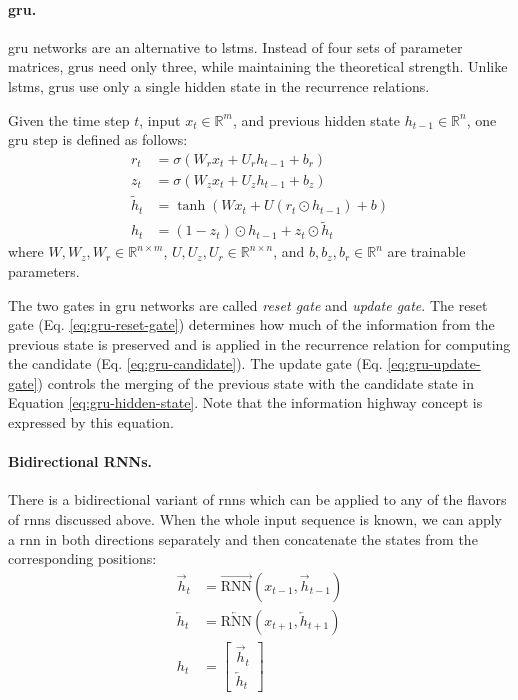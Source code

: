 \paragraph{\acs{gru}.} \acl{gru} networks \citep{cho-etal-2014-properties} are
an alternative to \acp{lstm}. Instead of four sets of parameter matrices,
\acp{gru} need only three, while maintaining the theoretical strength. Unlike
\acp{lstm}, \acp{gru} use only a single hidden state in the recurrence
relations.

Given the time step $t$, input $x_t \in \mathbb{R}^m$, and previous hidden
state $h_{t-1} \in \mathbb{R}^n$, one \ac{gru} step is defined as follows:
%
\begin{align}
  r_t &= \sigma\left(W_r x_t + U_r h_{t-1} + b_r\right) \label{eq:gru-reset-gate} \\
  z_t &= \sigma\left(W_z x_t + U_z h_{t-1} + b_z\right) \label{eq:gru-update-gate} \\
  \tilde{h}_t &= \tanh \left(W x_t + U \left( r_t \odot h_{t-1} \right) + b \right) \label{eq:gru-candidate} \\
  h_t &= (1 - z_t) \odot h_{t-1} + z_t \odot \tilde{h}_t \label{eq:gru-hidden-state}
\end{align}
%
where $W, W_z, W_r \in \mathbb{R}^{n\times m}$,
$U, U_z, U_r \in \mathbb{R}^{n \times n}$, and $b, b_z, b_r \in \mathbb{R}^n$
are trainable parameters.

The two gates in \ac{gru} networks are called \emph{reset gate} and
\emph{update gate}.  The reset gate (Eq. \ref{eq:gru-reset-gate}) determines
how much of the information from the previous state is preserved and is applied
in the recurrence relation for computing the candidate
(Eq. \ref{eq:gru-candidate}). The update gate (Eq.  \ref{eq:gru-update-gate})
controls the merging of the previous state with the candidate state in Equation
\ref{eq:gru-hidden-state}. Note that the information highway concept is
expressed by this equation.

\paragraph{Bidirectional RNNs.} There is a bidirectional variant of \acp{rnn}
which can be applied to any of the flavors of \acp{rnn} discussed above. When
the whole input sequence is known, we can apply a \ac{rnn} in both directions
separately and then concatenate the states from the corresponding positions:
%
\begin{align}
  \overrightarrow{h}_t &= \overrightarrow{\mathrm{RNN}}(x_{t-1}, \overrightarrow{h}_{t-1}) \\
  \overleftarrow{h}_t &= \overleftarrow{\mathrm{RNN}}(x_{t+1}, \overleftarrow{h}_{t+1}) \\
  h_t &= \left[ \begin{matrix} \overrightarrow{h}_t \\ \overleftarrow{h}_t \end{matrix} \right]
\end{align}

